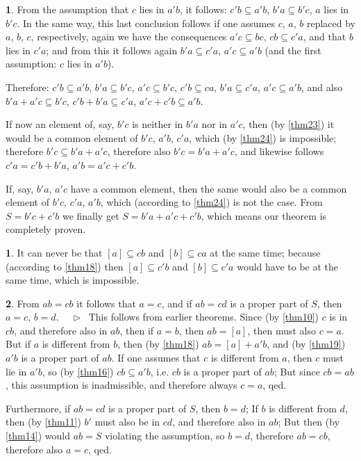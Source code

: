 \documentclass[leqno,hidelinks]{article}
\theoremstyle{definition}
\newtheorem{satz}{\protect\satzname}
\newtheorem*{zusatz}{\protect\zusatzname}
\newcommand{\satzname}{}
\newcommand{\zusatzname}{}
\renewcommand{\satzname}{\hspace{-4pt}.\ Satz}%
\renewcommand{\zusatzname}{Zusatz}%
\renewcommand{\satzname}{\hspace{-4pt}.\ Theorem}%
\renewcommand{\zusatzname}{Corollary}%
\newcommand\Beweis{\medskip \newline $ \phantom{'.'} \rhd \ $}%
\newcommand{\partof}{\subseteq}
\newcommand{\sref}[1]{\underline{\ref{#1}}}%
\begin{document}
\begin{paracol}{2}
\begin{satz}
From the assumption that $c$ lies in $a'b$, it follows: $c'b \partof a'b$,
$b'a \partof b'c$, $a$ lies in $b'c$. In the same way, this last
conclusion follows if one assumes $c$, $a$, $b$ replaced by $a$, $b$, $c$,
respectively, again we have the consequences $a'c \partof bc$, $cb \partof c'a$,
and that $b$ lies in $c'a$; and from this it follows again $b'a \partof c'a$,
$a'c \partof a'b$ (and the first assumption: $c$ lies in $a'b$).

Therefore: $c'b \partof a'b$, $b'a \partof b'c$, $a'c \partof b'c$,
$c'b \partof ca$, $b'a \partof c'a$, $a'c \partof a'b$, and also
$b'a + a'c \partof b'c$, $c'b + b'a \partof c'a$, $a'c + c'b \partof a'b$.

\newpage

If now an element of, say, $b'c$ is neither in $b'a$ nor in $a'c$, then
(by \sref{thm23}) it would be a common element of $b'c$, $a'b$, $c'a$,
which (by \sref{thm24}) is impossible; therefore $b'c \partof b'a + a'c$,
therefore also $b'c=b'a + a'c$, and likewise follows $c'a=c'b+b'a$, $a'b=a'c+c'b$.

If, say, $b'a$, $a'c$ have a common element, then the same would also be a common
element of $b'c$, $c'a$, $a'b$, which (according to \sref{thm24}) is not the case.
From $S=b'c+c'b$ we finally get $S=b'a+a'c+c'b$, which means our theorem is
completely proven.
\end{satz}

\begin{zusatz}
It can never be that $[a] \partof cb$ and $[b] \partof ca$ at the same time;
because (according to \sref{thm18}) then $[a] \partof c'b$ and $[b] \partof c'a$
would have to be at the same time, which is impossible.
\end{zusatz}

\begin{satz}\label{thm26}
From $ab=cb$ it follows that $a=c$, and if $ab=cd$ is a proper part of $S$,
then $a=c$, $b = d$.
\Beweis
This follows from earlier theorems.
Since (by \sref{thm10}) $c$ is in $cb$, and therefore also in $ab$, then if
$a=b$, then $ab = [a]$, then must also $c=a$. But if $a$ is different from $b$,
then (by \sref{thm18}) $ab = [a]+a'b$, and (by \sref{thm19}) $a'b$ is a proper
part of $ab$. If one assumes that $c$ is different from $a$, then $c$ must lie
in $a'b$, so (by \sref{thm16}) $cb \partof a'b$, i.e. $cb$ is a proper part of $ab$;
But since $cb=ab$, this assumption is inadmissible, and therefore always $c=a$, qed.

Furthermore, if $ab=cd$ is a proper part of $S$, then $b=d$; If $b$ is different
from $d$, then (by \sref{thm11}) $b'$ must also be in $cd$, and therefore also in
$ab$; But then (by \sref{thm14}) would $ab = S$ violating the assumption, so $b=d$,
therefore $ab=cb$, therefore also $a=c$, qed.
\end{satz}


\end{paracol}
\end{document}
